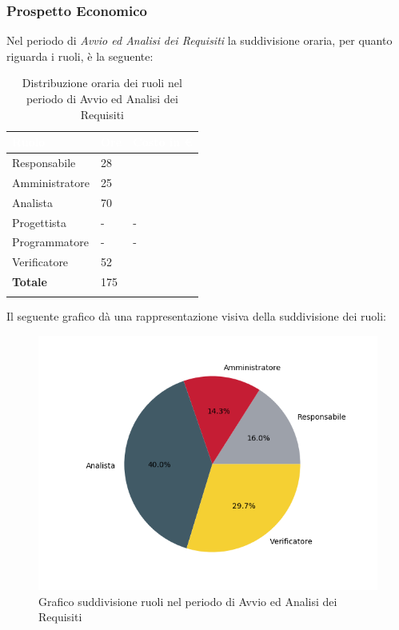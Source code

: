 \subsubsection{Prospetto Economico}
Nel periodo di \textit{Avvio ed Analisi dei Requisiti} la suddivisione oraria, per quanto riguarda i ruoli, è la seguente: 

\begin{longtable}{| C{.30\textwidth}| C{.15\textwidth}| C{.20\textwidth}|}
\hline
{}\textbf{\textcolor{white}{Ruolo}} & \textbf{\textcolor{white}{Ore}} & \textbf{\textcolor{white}{Costo in \euro}} \\
\hline
Responsabile & 28 &  \\
\hline
{}Amministratore & 25 &  \\
\hline
Analista & 70 &  \\
\hline
{}Progettista & - & - \\
\hline
Programmatore & - & - \\
\hline
{}Verificatore & 52 & \\
\hline
\textbf{Totale} & 175 &  \\
\hline

\caption{Distribuzione oraria dei ruoli nel periodo di Avvio ed Analisi dei Requisiti}
\label{tab: distribuzione oraria aar}
\end{longtable}

Il seguente grafico dà una rappresentazione visiva della suddivisione dei ruoli:
\begin{figure}[H]
	\centering
  		\includegraphics[width=1\linewidth]{./images/torta_aar.png}
  		\caption{Grafico suddivisione ruoli nel periodo di Avvio ed Analisi dei Requisiti}
  		\label{fig:grafico suddivione ruoli periodo di Avvio ed analisi dei requisiti}
\end{figure}

